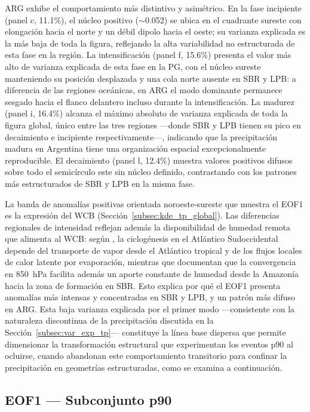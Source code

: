 ARG exhibe el comportamiento más distintivo y asimétrico. En la fase incipiente (panel c, 11.1\%), el núcleo positivo ($\sim$0.052) se ubica en el cuadrante sureste con elongación hacia el norte y un débil dipolo hacia el oeste; su varianza explicada es la más baja de toda la figura, reflejando la alta variabilidad no estructurada de esta fase en la región. La intensificación (panel f, 15.6\%) presenta el valor más alto de varianza explicada de esta fase en la PG, con el núcleo sureste manteniendo su posición desplazada y una cola norte ausente en SBR y LPB: a diferencia de las regiones oceánicas, en ARG el modo dominante permanece sesgado hacia el flanco delantero incluso durante la intensificación. La madurez (panel i, 16.4\%) alcanza el máximo absoluto de varianza explicada de toda la figura global, único entre las tres regiones —donde SBR y LPB tienen su pico en decaimiento e incipiente respectivamente—, indicando que la precipitación madura en Argentina tiene una organización espacial excepcionalmente reproducible. El decaimiento (panel l, 12.4\%) muestra valores positivos difusos sobre todo el semicírculo este sin núcleo definido, contrastando con los patrones más estructurados de SBR y LPB en la misma fase.

La banda de anomalías positivas orientada noroeste-sureste que muestra el EOF1 es la expresión del WCB (Sección~\ref{subsec:kde_tp_global}).  
Las diferencias regionales de intensidad reflejan además la disponibilidad de humedad remota que alimenta al WCB: según \citet{gozzo2017climatology}, la ciclogénesis en el Atlántico Sudoccidental depende del transporte de vapor desde el Atlántico tropical y de los flujos locales de calor latente por evaporación, mientras que \citet{rocha2016estudio} documentan que la convergencia en 850~hPa facilita además un aporte constante de humedad desde la Amazonía hacia la zona de formación en SBR.
Esto explica por qué el EOF1 presenta anomalías más intensas y concentradas en SBR y LPB, y un patrón más difuso en ARG.
Esta baja varianza explicada por el primer modo —consistente con la naturaleza discontinua de la precipitación discutida en la Sección~\ref{subsec:var_exp_tp}— constituye la línea base dispersa que permite dimensionar la transformación estructural que experimentan los eventos p90 al ocluirse, cuando abandonan este comportamiento transitorio para confinar la precipitación en geometrías estructuradas, como se examina a continuación.

\subsection{EOF1 --- Subconjunto p90}\label{subsec:eof1_tp_p90}
 
